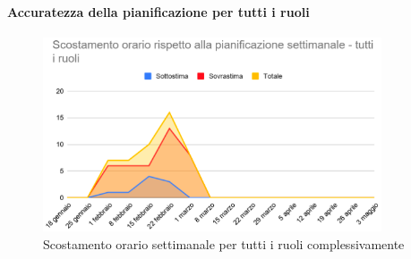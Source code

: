 \paragraph{Accuratezza della pianificazione per tutti i ruoli}
\begin{figure}[H]
	\centering
	\includegraphics[width=10cm]{res/images/tutti}
	\caption{Scostamento orario settimanale per tutti i ruoli complessivamente}
	\label{fig:Scostamento orario settimanale per tutti i ruoli complessivamente}
\end{figure}